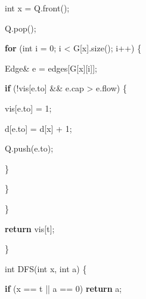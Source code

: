 \documentclass[
]{article}
\newenvironment{Shaded}{}{}
\newcommand{\ControlFlowTok}[1]{\textcolor[rgb]{0.00,0.44,0.13}{\textbf{#1}}}
\newcommand{\DataTypeTok}[1]{\textcolor[rgb]{0.56,0.13,0.00}{#1}}
\newcommand{\DecValTok}[1]{\textcolor[rgb]{0.25,0.63,0.44}{#1}}
\newcommand{\NormalTok}[1]{#1}
\newcommand{\OperatorTok}[1]{\textcolor[rgb]{0.40,0.40,0.40}{#1}}
\begin{document}
\begin{Shaded}
\begin{Highlighting}[]
      \DataTypeTok{int}\NormalTok{ x }\OperatorTok{=}\NormalTok{ Q}\OperatorTok{.}\NormalTok{front}\OperatorTok{();}

\NormalTok{      Q}\OperatorTok{.}\NormalTok{pop}\OperatorTok{();}

      \ControlFlowTok{for} \OperatorTok{(}\DataTypeTok{int}\NormalTok{ i }\OperatorTok{=} \DecValTok{0}\OperatorTok{;}\NormalTok{ i }\OperatorTok{\textless{}}\NormalTok{ G}\OperatorTok{[}\NormalTok{x}\OperatorTok{].}\NormalTok{size}\OperatorTok{();}\NormalTok{ i}\OperatorTok{++)} \OperatorTok{\{}

\NormalTok{        Edge}\OperatorTok{\&}\NormalTok{ e }\OperatorTok{=}\NormalTok{ edges}\OperatorTok{[}\NormalTok{G}\OperatorTok{[}\NormalTok{x}\OperatorTok{][}\NormalTok{i}\OperatorTok{]];}

        \ControlFlowTok{if} \OperatorTok{(!}\NormalTok{vis}\OperatorTok{[}\NormalTok{e}\OperatorTok{.}\NormalTok{to}\OperatorTok{]} \OperatorTok{\&\&}\NormalTok{ e}\OperatorTok{.}\NormalTok{cap }\OperatorTok{\textgreater{}}\NormalTok{ e}\OperatorTok{.}\NormalTok{flow}\OperatorTok{)} \OperatorTok{\{}

\NormalTok{          vis}\OperatorTok{[}\NormalTok{e}\OperatorTok{.}\NormalTok{to}\OperatorTok{]} \OperatorTok{=} \DecValTok{1}\OperatorTok{;}

\NormalTok{          d}\OperatorTok{[}\NormalTok{e}\OperatorTok{.}\NormalTok{to}\OperatorTok{]} \OperatorTok{=}\NormalTok{ d}\OperatorTok{[}\NormalTok{x}\OperatorTok{]} \OperatorTok{+} \DecValTok{1}\OperatorTok{;}

\NormalTok{          Q}\OperatorTok{.}\NormalTok{push}\OperatorTok{(}\NormalTok{e}\OperatorTok{.}\NormalTok{to}\OperatorTok{);}

        \OperatorTok{\}}

      \OperatorTok{\}}

    \OperatorTok{\}}

    \ControlFlowTok{return}\NormalTok{ vis}\OperatorTok{[}\NormalTok{t}\OperatorTok{];}

  \OperatorTok{\}}

  \DataTypeTok{int}\NormalTok{ DFS}\OperatorTok{(}\DataTypeTok{int}\NormalTok{ x}\OperatorTok{,} \DataTypeTok{int}\NormalTok{ a}\OperatorTok{)} \OperatorTok{\{}

    \ControlFlowTok{if} \OperatorTok{(}\NormalTok{x }\OperatorTok{==}\NormalTok{ t }\OperatorTok{||}\NormalTok{ a }\OperatorTok{==} \DecValTok{0}\OperatorTok{)} \ControlFlowTok{return}\NormalTok{ a}\OperatorTok{;}


\end{Highlighting}
\end{Shaded}
\end{document}
